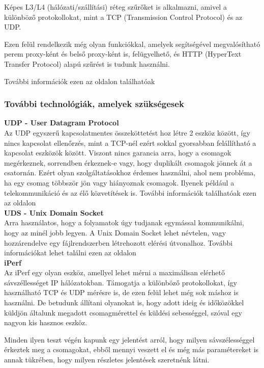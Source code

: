 \documentclass[a4paper,oneside]{article}
\begin{document}
Képes L3/L4 (hálózati/szállítási) réteg szűrőket is alkalmazni, amivel a
különböző protokollokat, mint a TCP (Transmission Control Protocol) és az
UDP.

Ezen felül rendelkezik még olyan funkciókkal, amelyek segítségével
megvalósítható perem proxy-ként és belső proxy-ként is, felügyelhető,
és HTTP (HyperText Transfer Protocol) alapú szűrést is tudunk használni.

További információk ezen az oldalon találhatóak ~\cite{envoydoc}

\subsubsection{További technológiák, amelyek szükségesek}
\textbf{UDP - User Datagram Protocol} \\
Az UDP egyszerű kapcsolatmentes összeköttetést hoz létre 2 eszköz
között, így nincs kapcsolat ellenőrzés, mint a TCP-nél ezért sokkal
gyorsabban felállítható a kapcsolat eszközök között. Viszont nincs
garancia arra, hogy a csomagok megérkeznek, sorrendben érkeznek-e
vagy, hogy duplikált csomagok jönnek át a csatornán. Ezért olyan
szolgáltatásokhoz érdemes használni, ahol nem probléma, ha egy
csomag többször jön vagy hiányoznak csomagok. Ilyenek például a
telekommunikáció és az élő közvetítések is. További információk
találhatóak ezen az oldalon ~\cite{udpwiki} \\

\textbf{UDS - Unix Domain Socket} \\
Arra használatos, hogy a folyamatok úgy tudjanak egymással kommunikálni,
hogy az minél jobb legyen. A Unix Domain Socket lehet névtelen, vagy
hozzárendelve egy fájlrendszerben létrehozott elérési útvonalhoz.
További információkat lehet találni ezen az oldalon ~\cite{udsman} \\

\textbf{iPerf} \\
Az iPerf egy olyan eszköz, amellyel lehet mérni a maximálisan elérhető
sávszéllességet IP hálózatokban. Támogatja a különböző protokollokat, így
használható TCP és UDP mérésre is, de ezen felül lehet még sok máshoz is használni.
De betudunk állítani olyanokat is, hogy adott ideig és időközökkel küldjön
általunk megadott csomagmérettel és küldési sebességgel, szóval egy
nagyon kis hasznos eszköz.

Minden ilyen teszt végén kapunk egy jelentést arról, hogy milyen sávszélességgel
érkeztek meg a csomagokat, ebből mennyi veszett el és még más paramétereket is
annak tükrében, hogy milyen részletes jelentések szeretnénk látni.
\end{document}
